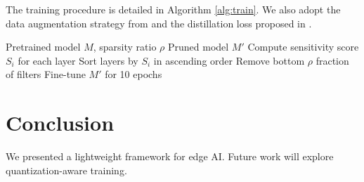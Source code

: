 \documentclass{article} %
\begin{document}
The training procedure is detailed in Algorithm \ref{alg:train}. We also adopt the data
augmentation strategy from \cite{liu2016ssd} and the distillation loss proposed in
\cite{hinton2015distill,missing_ref}. %

\begin{algorithm}
\caption{Adaptive Pruning Routine}
\begin{algorithmic}[1]
\Require Pretrained model $M$, sparsity ratio $\rho$
\Ensure Pruned model $M'$
\State Compute sensitivity score $S_i$ for each layer
\State Sort layers by $S_i$ in ascending order
\State Remove bottom $\rho$ fraction of filters
\State Fine-tune $M'$ for 10 epochs
\end{algorithmic}
\label{alg:train}
\end{algorithm}

\section{Conclusion}
We presented a lightweight framework for edge AI. Future work will explore
quantization-aware training.



\end{document}
